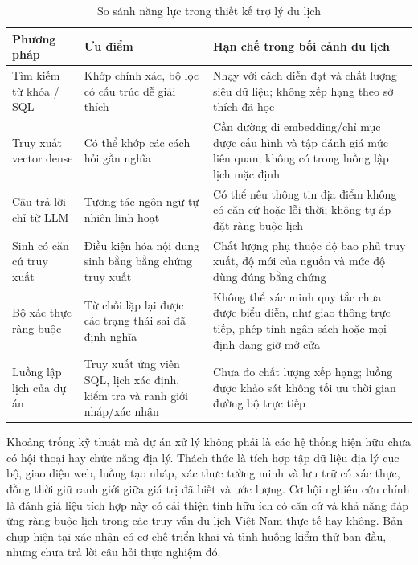 \begin{table}[htbp]
    \centering
    \caption{So sánh năng lực trong thiết kế trợ lý du lịch}
    \label{tab:related_comparison}
    \renewcommand{\arraystretch}{1.25}
    \begin{tabularx}{\textwidth}{>{\raggedright\arraybackslash}p{3.0cm} >{\raggedright\arraybackslash}p{4.0cm} X}
        \toprule
        \textbf{Phương pháp} & \textbf{Ưu điểm} & \textbf{Hạn chế trong bối cảnh du lịch} \\
        \midrule
        Tìm kiếm từ khóa / SQL & Khớp chính xác, bộ lọc có cấu trúc dễ giải thích & Nhạy với cách diễn đạt và chất lượng siêu dữ liệu; không xếp hạng theo sở thích đã học \\
        Truy xuất vector dense & Có thể khớp các cách hỏi gần nghĩa \cite{karpukhin2020dense,reimers2019sentence} & Cần đường đi embedding/chỉ mục được cấu hình và tập đánh giá mức liên quan; không có trong luồng lập lịch mặc định \\
        Câu trả lời chỉ từ LLM & Tương tác ngôn ngữ tự nhiên linh hoạt \cite{brown2020language} & Có thể nêu thông tin địa điểm không có căn cứ hoặc lỗi thời; không tự áp đặt ràng buộc lịch \\
        Sinh có căn cứ truy xuất & Điều kiện hóa nội dung sinh bằng bằng chứng truy xuất \cite{lewis2020retrieval} & Chất lượng phụ thuộc độ bao phủ truy xuất, độ mới của nguồn và mức độ dùng đúng bằng chứng \\
        Bộ xác thực ràng buộc & Từ chối lặp lại được các trạng thái sai đã định nghĩa & Không thể xác minh quy tắc chưa được biểu diễn, như giao thông trực tiếp, phép tính ngân sách hoặc mọi định dạng giờ mở cửa \\
        Luồng lập lịch của dự án & Truy xuất ứng viên SQL, lịch xác định, kiểm tra và ranh giới nháp/xác nhận & Chưa đo chất lượng xếp hạng; luồng được khảo sát không tối ưu thời gian đường bộ trực tiếp \\
        \bottomrule
    \end{tabularx}
\end{table}

Khoảng trống kỹ thuật mà dự án xử lý không phải là các hệ thống hiện hữu chưa có hội thoại hay chức năng địa lý. Thách thức là tích hợp tập dữ liệu địa lý cục bộ, giao diện web, luồng tạo nháp, xác thực tường minh và lưu trữ có xác thực, đồng thời giữ ranh giới giữa giá trị đã biết và ước lượng. Cơ hội nghiên cứu chính là đánh giá liệu tích hợp này có cải thiện tính hữu ích có căn cứ và khả năng đáp ứng ràng buộc lịch trong các truy vấn du lịch Việt Nam thực tế hay không. Bản chụp hiện tại xác nhận có cơ chế triển khai và tình huống kiểm thử ban đầu, nhưng chưa trả lời câu hỏi thực nghiệm đó.
